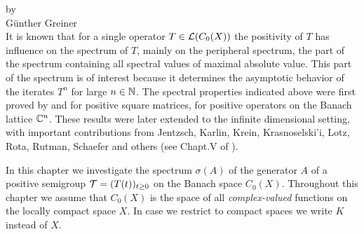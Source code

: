 \label{chap:b3}%
\thispagestyle{empty}
{\Large
\vspace*{-.75cm}
by \\[.25em]
Günther Greiner
\vspace{.75cm}
\\
}
It is known that for a single operator $T \in \mathcal{L}(C_{0}(X))$ the positivity of\/ $T$ has influence on the spectrum of\/ $T$, mainly on the peripheral spectrum, \ie the part of the spectrum containing all spectral values of maximal absolute value.
This part of the spectrum is of interest because it determines the asymptotic behavior of the iterates $T^{n}$ for large $n \in \mathbb{N}$.
The spectral properties indicated above were first proved by \textcite{perron:1907} and \textcite{frobenius:1909} for positive square matrices, \ie for positive operators on the Banach lattice $\mathbb{C}^{n}$.
These results were later extended to the infinite dimensional setting, with important contributions from Jentzsch, Karlin, Krein, Krasnoselski'i, Lotz, Rota, Rutman, Schaefer and others (see Chapt.V of \textcite{schaefer:1974}).

In this chapter we investigate the spectrum $\sigma(A)$ of the generator $A$ of a positive semigroup $\TT = (T(t))_{t \geq 0}$ on the Banach space $C_{0}(X)$.
Throughout this chapter we assume that $C_{0}(X)$ is the space of all \emph{complex-valued} functions on the locally compact space $X$.
In case we restrict to compact spaces we write $K$ instead of\/ $X$.

